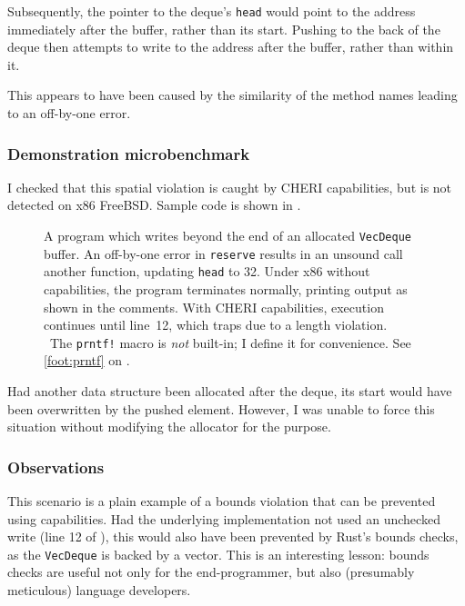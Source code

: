 \documentclass[dissertation.tex]{subfiles}
\begin{document}
Subsequently, the pointer to the deque's \texttt{head} would point to
the address immediately after the buffer, rather than its start.
Pushing to the back of the deque then attempts to write to the address
after the buffer, rather than within it.

This appears to have been caused by the similarity of the method names
leading to an off-by-one error.

\subsubsection{Demonstration microbenchmark}
I checked that this spatial violation is caught by CHERI capabilities,
but is not detected on x86 FreeBSD.
Sample code is shown in .

\begin{figure}[ht]
    
    \caption{
        A program which writes beyond the end of an allocated
        \texttt{VecDeque} buffer.
        An off-by-one error in \texttt{reserve} results in an unsound
        call another function, updating \texttt{head} to 32.
        Under x86 without capabilities, the program terminates normally,
        printing output as shown in the
        comments.{\protect\textsuperscript\textdagger}
        With CHERI capabilities, execution continues until line~12, which
        traps due to a length violation.
        \\ {\footnotesize \protect\textdagger\ The \texttt{prntf!} macro
        is \emph{not} built-in; I define it for convenience. See
        \cref{foot:prntf} on .}
    }
    \label{lst:micro-capacity}
\end{figure}

Had another data structure been allocated after the deque, its start
would have been overwritten by the pushed element.
However, I was unable to force this situation without modifying the
allocator for the purpose.

\subsubsection{Observations}
This scenario is a plain example of a bounds violation that can be
prevented using capabilities.
Had the underlying implementation not used an unchecked write (line 12
of ), this would also have been prevented by Rust's
bounds checks, as the \texttt{VecDeque} is backed by a vector.
This is an interesting lesson: bounds checks are useful not only for the
end-programmer, but also (presumably meticulous) language developers.
\end{document}
